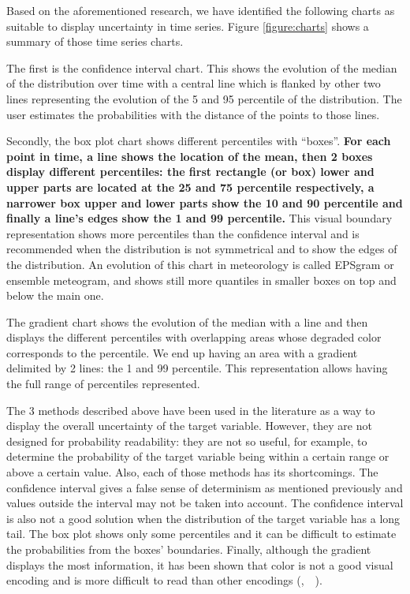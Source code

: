 \documentclass[a4paper,3p,sort&compress]{elsarticle}
\DeclareRobustCommand{\citeext}[1]{\citeauthor{#1},~\citeyear{#1}~\cite{#1}}
\begin{document}
Based on the aforementioned research, we have identified the following charts as
suitable to display uncertainty in time series. Figure \ref{figure:charts} shows
a summary of those time series charts.

The first is the confidence interval chart. This shows the evolution of the
median of the distribution over time with a central line which is flanked by
other two lines representing the evolution of the 5 and 95
percentile of the distribution. The user estimates the probabilities with the
distance of the points to those lines.

Secondly, the box plot chart shows different percentiles with “boxes”. \textbf{For each
point in time, a line shows the location of the mean, then 2 boxes display
different percentiles: the first rectangle (or box) lower and upper parts are
located at the 25 and 75 percentile respectively, a narrower box
upper and lower parts show the 10 and 90 percentile and finally a
line’s edges show the 1 and 99 percentile.} This visual boundary
representation shows more percentiles than the confidence interval and is
recommended when the distribution is not symmetrical and to show the edges of
the distribution. An evolution of this chart in meteorology is called EPSgram or
ensemble meteogram, and shows still more quantiles in smaller boxes on top and
below the main one.

The gradient chart shows the evolution of the median with a line and then
displays the different percentiles with overlapping areas whose degraded color
corresponds to the percentile. We end up having an area with a gradient
delimited by 2 lines: the 1 and 99 percentile. This representation
allows having the full range of percentiles represented.

The 3 methods described above have been used in the literature as a way to
display the overall uncertainty of the target variable. However, they are not
designed for probability readability: they are not so useful, for example, to
determine the probability of the target variable being within a certain range or
above a certain value. Also, each of those methods has its shortcomings. The
confidence interval gives a false sense of determinism as mentioned previously
and values outside the interval may not be taken into account. The confidence
interval is also not a good solution when the distribution of the target
variable has a long tail. The box plot shows only some percentiles and it can be
difficult to estimate the probabilities from the boxes' boundaries. Finally,
although the gradient displays the most information, it has been shown that
color is not a good visual encoding and is more difficult to read than other
encodings (\citeext{cleveland_graphical_1984}).
\end{document}
